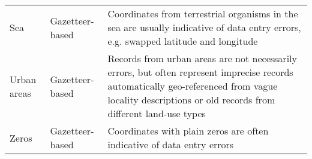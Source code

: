 \documentclass[fleqn,10pt,lineno]{wlpeerj} %
\begin{document}
\begin{table}[!h]
\begin{tabular}[t]{>{\raggedright\arraybackslash}p{2cm}>{\raggedright\arraybackslash}p{2.5cm}>{\raggedright\arraybackslash}p{10cm}}
\addlinespace
\rowcolor{gray!6}  Sea & Gazetteer-based & Coordinates from terrestrial organisms in the sea are usually indicative of data entry errors, e.g. swapped latitude and longitude\\
Urban areas & Gazetteer-based & Records from urban areas are not necessarily errors, but often represent imprecise records automatically geo-referenced from vague locality descriptions or old records from different land-use types\\
\rowcolor{gray!6}  Zeros & Gazetteer-based & Coordinates with plain zeros are often indicative of data entry errors\\
\bottomrule
\end{tabular}
\end{table}

\begin{landscape}\begin{table}


\end{table}
\end{landscape}
\end{document}
